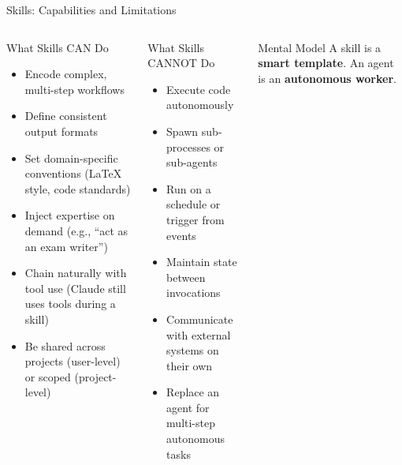 \documentclass[aspectratio=169,xcolor=dvipsnames]{beamer}
\begin{document}
\begin{frame}{Skills: Capabilities and Limitations}
    \begin{columns}
        \begin{exampleblock}{What Skills CAN Do}
            \begin{itemize}
                \item Encode complex, multi-step workflows
                \item Define consistent output formats
                \item Set domain-specific conventions (LaTeX style, code standards)
                \item Inject expertise on demand (e.g., ``act as an exam writer'')
                \item Chain naturally with tool use (Claude still uses tools during a skill)
                \item Be shared across projects (user-level) or scoped (project-level)
            \end{itemize}
        \end{exampleblock}

        \begin{alertblock}{What Skills CANNOT Do}
            \begin{itemize}
                \item Execute code autonomously
                \item Spawn sub-processes or sub-agents
                \item Run on a schedule or trigger from events
                \item Maintain state between invocations
                \item Communicate with external systems on their own
                \item Replace an agent for multi-step autonomous tasks
            \end{itemize}
        \end{alertblock}
        \vspace{0.2cm}
        \begin{block}{Mental Model}
            A skill is a \textbf{smart template}. An agent is an \textbf{autonomous worker}.
        \end{block}
    \end{columns}
\end{frame}
\end{document}
